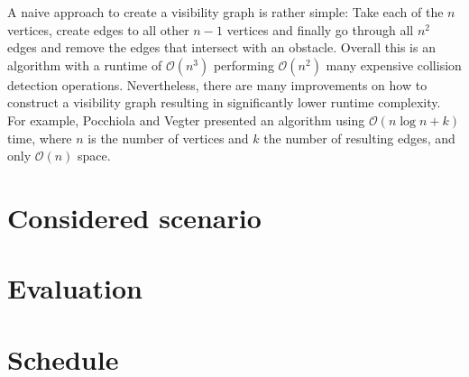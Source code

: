 \documentclass[
	a4paper,
	11pt,
	twoside,
	twocolumn
]{article}
\newcommand{\bigo}[1]{\mathcal{O}(#1)}
\begin{document}
			A naive approach to create a visibility graph is rather simple: Take each of the $n$ vertices, create edges to all other $n-1$ vertices and finally go through all $n^2$ edges and remove the edges that intersect with an obstacle.
			Overall this is an algorithm with a runtime of $\bigo{n^3}$ performing $\bigo{n^2}$ many expensive collision detection operations.
			Nevertheless, there are many improvements on how to construct a visibility graph resulting in significantly lower runtime complexity.
			For example, Pocchiola and Vegter presented an algorithm using $\bigo{n \log{n} + k}$ time, where $n$ is the number of vertices and $k$ the number of resulting edges, and only $\bigo{n}$ space.\cite{pocchiola1996topologically}
		
		
	\section{Considered scenario}
	
		
	\section{Evaluation}
	
		
	
	\section{Schedule}
	
	
	\printbibliography
\end{document}

